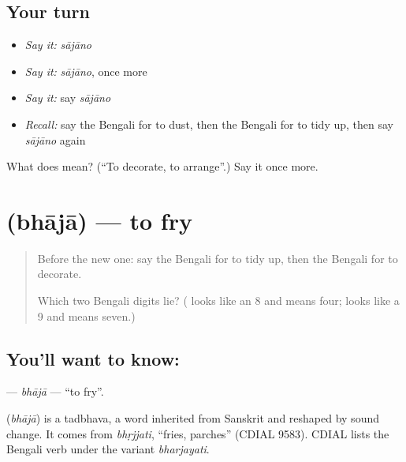 \subsection*{Your turn}
\begin{itemize}
\raggedright
  \item \emph{Say it:} \emph{sājāno}
  \item \emph{Say it:} \emph{sājāno}, once more
  \item \emph{Say it:} say \emph{sājāno}
  \item \emph{Recall:} say the Bengali for to dust, then the Bengali for to tidy up, then say \emph{sājāno} again
\end{itemize}

\begin{tcolorbox}[breakable,colback=teal!4,colframe=teal!35!black,title={Before you move on}]
What does  mean? (\textquotedblleft{}To decorate, to arrange\textquotedblright{}.) Say it once more.
\end{tcolorbox}
\section[\texorpdfstring{\bn{ভাজা} (bhājā)}{ভাজা (bhājā)}]{ (bhājā) — to fry}

\label{lesson:BN-C105-bhaja}



\begin{quote}
Before the new one: say the Bengali for to tidy up, then the Bengali for to decorate.

Which two Bengali digits lie? (\textbf{} looks like an 8 and means four; \textbf{} looks like a 9 and means seven.)
\end{quote}

\subsection*{You'll want to know: }
\textbf{} — \emph{bhājā} — \textquotedblleft{}to fry\textquotedblright{}.

\begin{cousinweb}
\textbf{} (\emph{bhājā}) is a tadbhava, a word inherited from Sanskrit and reshaped by sound change. It comes from \emph{bhṛjjati}, \textquotedblleft{}fries, parches\textquotedblright{} (CDIAL 9583). CDIAL lists the Bengali verb under the variant \emph{bharjayati}.
\end{cousinweb}

